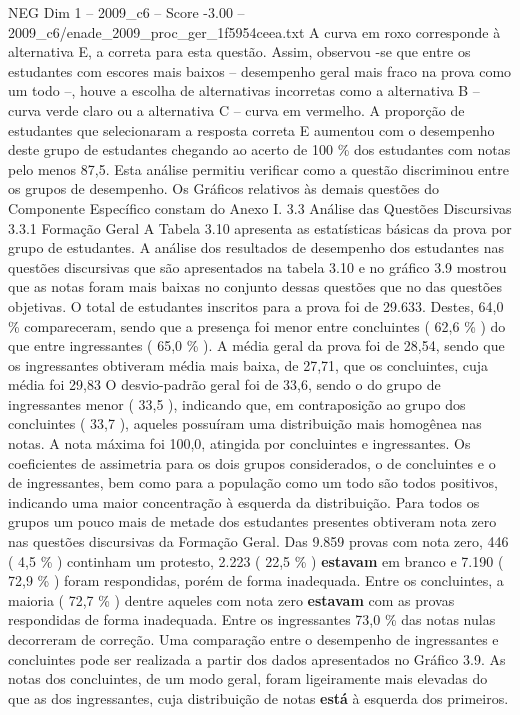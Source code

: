 \begin{textsample}{NEG Dim 1 – 2009\_c6 – Score -3.00 – 2009\_c6/enade\_2009\_proc\_ger\_1f5954ceea.txt}
A curva em roxo corresponde à alternativa E, a correta para esta questão.
Assim, observou -se que entre os estudantes com escores mais baixos – desempenho geral mais fraco na prova como um todo –, houve a escolha de alternativas incorretas como a alternativa B – curva verde claro ou a alternativa C – curva em vermelho.
A proporção de estudantes que selecionaram a resposta correta E aumentou com o desempenho deste grupo de estudantes chegando ao acerto de 100 \% dos estudantes com notas pelo menos 87,5.
Esta análise permitiu verificar como a questão discriminou entre os grupos de desempenho.
Os Gráficos relativos às demais questões do Componente Específico constam do Anexo I. 3.3 Análise das Questões Discursivas 3.3.1 Formação Geral A Tabela 3.10 apresenta as estatísticas básicas da prova por grupo de estudantes.
A análise dos resultados de desempenho dos estudantes nas questões discursivas que são apresentados na tabela 3.10 e no gráfico 3.9 mostrou que as notas foram mais baixas no conjunto dessas questões que no das questões objetivas.
O total de estudantes inscritos para a prova foi de 29.633.
Destes, 64,0 \% compareceram, sendo que a presença foi menor entre concluintes ( 62,6 \% ) do que entre ingressantes ( 65,0 \% ).
A média geral da prova foi de 28,54, sendo que os ingressantes obtiveram média mais baixa, de 27,71, que os concluintes, cuja média foi 29,83 O desvio-padrão geral foi de 33,6, sendo o do grupo de ingressantes menor ( 33,5 ), indicando que, em contraposição ao grupo dos concluintes ( 33,7 ), aqueles possuíram uma distribuição mais homogênea nas notas.
A nota máxima foi 100,0, atingida por concluintes e ingressantes.
Os coeficientes de assimetria para os dois grupos considerados, o de concluintes e o de ingressantes, bem como para a população como um todo são todos positivos, indicando uma maior concentração à esquerda da distribuição.
Para todos os grupos um pouco mais de metade dos estudantes presentes obtiveram nota zero nas questões discursivas da Formação Geral.
Das 9.859 provas com nota zero, 446 ( 4,5 \% ) continham um protesto, 2.223 ( 22,5 \% ) \textbf{estavam} em branco e 7.190 ( 72,9 \% ) foram respondidas, porém de forma inadequada.
Entre os concluintes, a maioria ( 72,7 \% ) dentre aqueles com nota zero \textbf{estavam} com as provas respondidas de forma inadequada.
Entre os ingressantes 73,0 \% das notas nulas decorreram de correção.
Uma comparação entre o desempenho de ingressantes e concluintes pode ser realizada a partir dos dados apresentados no Gráfico 3.9.
As notas dos concluintes, de um modo geral, foram ligeiramente mais elevadas do que as dos ingressantes, cuja distribuição de notas \textbf{está} à esquerda dos primeiros.

\end{textsample}
